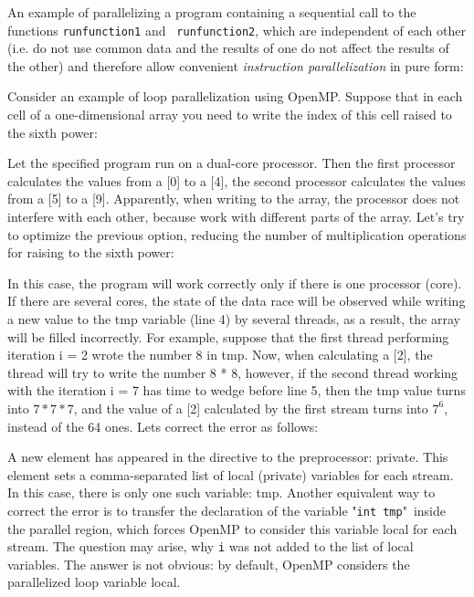 {	\par An example of parallelizing a program containing a sequential call to the functions \texttt{run\textunderscore function1} and \texttt{ run\textunderscore function2}, which are independent of each other (i.e. do not use common data and the results of one do not affect the results of the other) and therefore allow convenient \textit{instruction parallelization} in pure form:
	\begin{figure}[H]
		
	\end{figure}
	\par Consider an example of loop parallelization using OpenMP. Suppose that in each cell of a one-dimensional array you need to write the index of this cell raised to the sixth power:
	\begin{figure}[H]
		
	\end{figure}
	\par Let the specified program run on a dual-core processor. Then the first processor calculates the values from a [0] to a [4], the second processor calculates the values from a [5] to a [9]. Apparently, when writing to the array, the processor does not interfere with each other, because work with different parts of the array. Let's try to optimize the previous option, reducing the number of multiplication operations for raising to the sixth power:
	\begin{figure}[H]
		
	\end{figure}
	\par In this case, the program will work correctly only if there is one processor (core). If there are several cores, the state of the data race will be observed while writing a new value to the tmp variable (line 4) by several threads, as a result, the array will be filled incorrectly. For example, suppose that the first thread performing iteration i = 2 wrote the number 8 in tmp. Now, when calculating a [2], the thread will try to write the number 8 * 8, however, if the second thread working with the iteration i = 7 has time to wedge before line 5, then the tmp value turns into $7 * 7 * 7$, and the value of a [2] calculated by the first stream turns into $ 7 ^ 6 $, instead of the 64 ones. Lets correct the error as follows:
	\begin{figure}[H]
		
	\end{figure}
	\par A new element has appeared in the directive to the preprocessor: private. This element sets a comma-separated list of local (private) variables for each stream. In this case, there is only one such variable: tmp. Another equivalent way to correct the error is to transfer the declaration of the variable "\texttt{int tmp}"\ inside the parallel region, which forces OpenMP to consider this variable local for each stream. The question may arise, why \texttt{i} was not added to the list of local variables. The answer is not obvious: by default, OpenMP considers the parallelized loop variable local.
}
